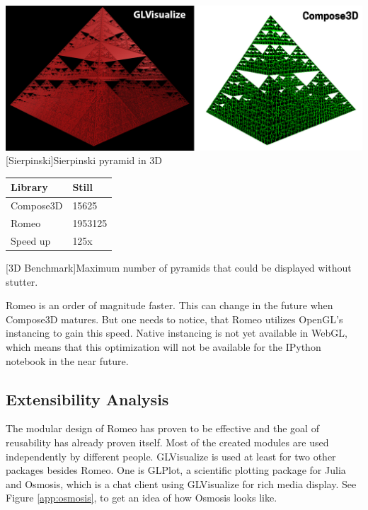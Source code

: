 \begin{minipage}{\linewidth}
    \centering
    \includegraphics[width=\linewidth]{graphics/sierpinsky.jpg}
    [Sierpinski]{Sierpinski pyramid in 3D}
    \label{fig:reactive1}
\end{minipage}
\begin{table}[htbp]
    \centering
    \begin{tabular}{l|l}
        \hline
        \textbf{Library} & \textbf{Still}\\ 
        \hline
        Compose3D        & 15625         \\
        Romeo            & 1953125       \\
        \hline
        \hline
        Speed up         & 125x          \\
    \end{tabular}
    [3D Benchmark]{Maximum number of pyramids that could be displayed without stutter.}
    \label{table:relativespeedoglw}
\end{table}

Romeo is an order of magnitude faster. This can change in the future when Compose3D matures.
But one needs to notice, that Romeo utilizes OpenGL's instancing to gain this speed. Native instancing is not yet available in WebGL, which means that this optimization will not be available for the IPython notebook in the near future.

\subsection{Extensibility Analysis}

The modular design of Romeo has proven to be effective and the goal of reusability has already proven itself.
Most of the created modules are used independently by different people.
GLVisualize is used at least for two other packages besides Romeo. 
One is GLPlot\cite{GLPlot}, a scientific plotting package for Julia and Osmosis\cite{Osmosis}, which is a chat client using GLVisualize for rich media display.
See Figure \ref{app:osmosis}, to get an idea of how Osmosis looks like.


